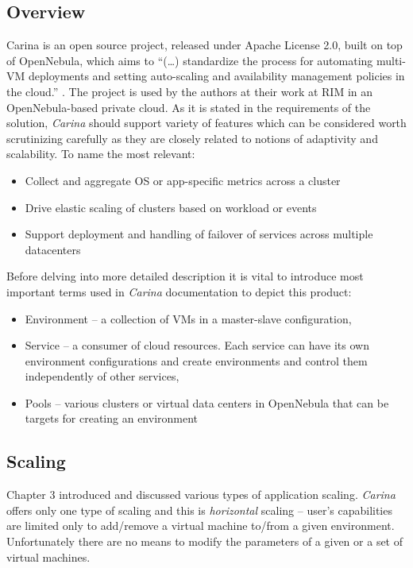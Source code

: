\subsection{Overview}
Carina is an open source project, released under Apache License 2.0, built on top of OpenNebula, which aims to ``(\ldots) standardize the process for automating multi-VM deployments and setting auto-scaling and availability management policies in the cloud.'' \cite{CarinaBlog}. The project is used by the authors at their work at RIM in an OpenNebula-based private cloud.
As it is stated in the requirements of the solution, \emph{Carina} should support variety of features which can be considered worth scrutinizing carefully as they are closely related to notions of adaptivity and scalability. To name the most relevant: \cite{CarinaBlog}
\begin{itemize}
  \item Collect and aggregate OS or app-specific metrics across a cluster
  \item Drive elastic scaling of clusters based on workload or events
  \item Support deployment and handling of failover of services across multiple datacenters
\end{itemize}

Before delving into more detailed description it is vital to introduce most important terms used in \emph{Carina} documentation to depict this product:
\begin{itemize}
  \item Environment -- a collection of VMs in a master-slave configuration,
  \item Service -- a consumer of cloud resources. Each service can have its own environment configurations and create environments and control them independently of other services,
  \item Pools -- various clusters or virtual data centers in OpenNebula that can be targets for creating an environment
\end{itemize}

\subsection{Scaling}
Chapter 3 introduced and discussed various types of application scaling. \emph{Carina} offers only one type of scaling and this is \emph{horizontal} scaling -- user's capabilities are limited only to add/remove a virtual machine to/from a given environment. Unfortunately there are no means to modify the parameters of a given or a set of virtual machines.

